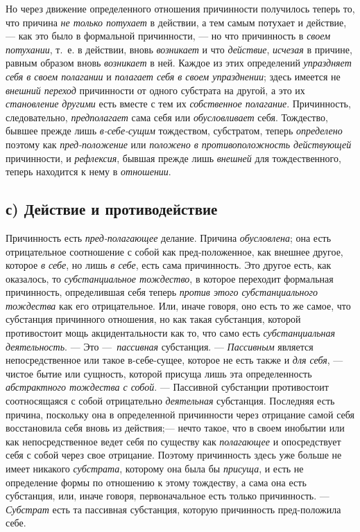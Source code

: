 Но через движение определенного отношения причинности получилось теперь то,
что причина {\em не только потухает} в действии, а тем
самым потухает и действие, — как это было в формальной причинности, — но
что причинность в {\em своем потухании}, т.~е. в
действии, вновь {\em возникает} и что
{\em действие}, {\em исчезая} в
причине, равным образом вновь {\em возникает} в ней.
Каждое из этих определений {\em упраздняет себя в своем
полагании} и {\em полагает себя в своем упразднении};
здесь имеется не {\em внешний переход} причинности от
одного субстрата на другой, а это их {\em становление
другими} есть вместе с тем их {\em собственное
полагание}. Причинность, следовательно,
{\em предполагает} сама себя или
{\em обусловливает} себя. Тождество, бывшее прежде лишь
{\em в-себе-сущим} тождеством, субстратом, теперь
{\em определено} поэтому как
{\em пред-положение} или
{\em положено в противоположность действующей}
причинности, и {\em рефлексия}, бывшая прежде лишь
{\em внешней} для тождественного, теперь находится к
нему в {\em отношении}.


\subsection[с) Действие и противодействие]{с) Действие и противодействие}

Причинность есть
{\em пред-полагающее} делание. Причина
{\em обусловлена}; она есть отрицательное соотношение с
собой как пред-положенное, как внешнее другое, которое
{\em в себе}, но лишь {\em в себе},
есть сама причинность. Это другое есть, как оказалось, то
{\em субстанциальное тождество}, в которое переходит
формальная причинность, определившая себя теперь
{\em против этого субстанциального тождества} как его
отрицательное. Или, иначе говоря, оно есть то же самое, что субстанция
причинного отношения, но как такая субстанция, которой противостоит мощь
акцидентальности как то, что само есть
{\em субстанциальная деятельность}. — Это
—~{\em пассивная} субстанция. —
{\em Пассивным} является непосредственное или такое
в-себе-сущее, которое не есть также и {\em для себя}, —
чистое бытие или сущность, которой присуща лишь эта определенность
{\em абстрактного тождества с собой}. — Пассивной
субстанции противостоит соотносящаяся с собой отрицательно
{\em деятельная} субстанция. Последняя есть причина,
поскольку она в определенной причинности через отрицание самой себя
восстановила себя вновь из действия;— нечто такое, что в своем инобытии или
как непосредственное ведет себя по существу как
{\em полагающее} и опосредствует себя с собой через
свое отрицание. Поэтому причинность здесь уже больше не имеет никакого
{\em субстрата}, которому она была бы
{\em присуща}, и есть не определение формы по отношению
к этому тождеству, а сама она есть субстанция, или, иначе говоря,
первоначальное есть только причинность. —
{\em Субстрат} есть та пассивная субстанция, которую
причинность пред-положила себе.

